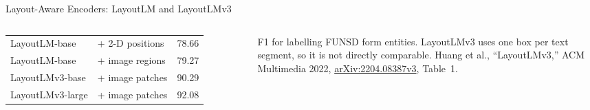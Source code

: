 \begin{frame}{Layout-Aware Encoders: LayoutLM and LayoutLMv3}
\begin{columns}[T,onlytextwidth]
{\begin{tabular}{@{}p{2.4cm} p{2.3cm} p{0.8cm}@{}}
        LayoutLM-base & + 2-D positions & 78.66 \\
        LayoutLM-base & + image regions & 79.27 \\
        LayoutLMv3-base & + image patches & 90.29 \\
        LayoutLMv3-large & + image patches & 92.08 \\
        \bottomrule
      \end{tabular}\par}
      {\scriptsize F1 for labelling FUNSD form entities. LayoutLMv3 uses one box per text segment, so it is not directly comparable. Huang et al., ``LayoutLMv3,'' ACM Multimedia 2022, \href{https://arxiv.org/abs/2204.08387v3}{arXiv:2204.08387v3}, Table~1.\par}
  \end{columns}
\end{frame}

